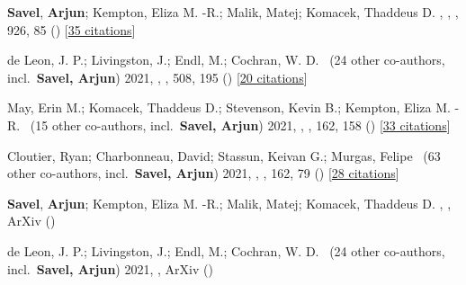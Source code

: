 \item[{\color{numcolor}\scriptsize15}] \textbf{Savel}, \textbf{Arjun}; Kempton, Eliza M. -R.; Malik, Matej; Komacek, Thaddeus D. , , \apj, {926}, 85 () [\href{https://ui.adsabs.harvard.edu/abs/2022ApJ...926...85S}{35 citations}]

\item[{\color{numcolor}\scriptsize14}] de Leon, J. P.; Livingston, J.; Endl, M.; Cochran, W. D. \etal\ ({24} other co-authors, incl.\ \textbf{Savel, Arjun}) 2021, , \mnras, {508}, 195 () [\href{https://ui.adsabs.harvard.edu/abs/2021MNRAS.508..195D}{20 citations}]

\item[{\color{numcolor}\scriptsize13}] May, Erin M.; Komacek, Thaddeus D.; Stevenson, Kevin B.; Kempton, Eliza M. -R. \etal\ ({15} other co-authors, incl.\ \textbf{Savel, Arjun}) 2021, , \aj, {162}, 158 () [\href{https://ui.adsabs.harvard.edu/abs/2021AJ....162..158M}{33 citations}]

\item[{\color{numcolor}\scriptsize12}] Cloutier, Ryan; Charbonneau, David; Stassun, Keivan G.; Murgas, Felipe \etal\ ({63} other co-authors, incl.\ \textbf{Savel, Arjun}) 2021, , \aj, {162}, 79 () [\href{https://ui.adsabs.harvard.edu/abs/2021AJ....162...79C}{28 citations}]

\item[{\color{numcolor}\scriptsize11}] \textbf{Savel}, \textbf{Arjun}; Kempton, Eliza M. -R.; Malik, Matej; Komacek, Thaddeus D. , , ArXiv ()

\item[{\color{numcolor}\scriptsize10}] de Leon, J. P.; Livingston, J.; Endl, M.; Cochran, W. D. \etal\ ({24} other co-authors, incl.\ \textbf{Savel, Arjun}) 2021, , ArXiv ()

